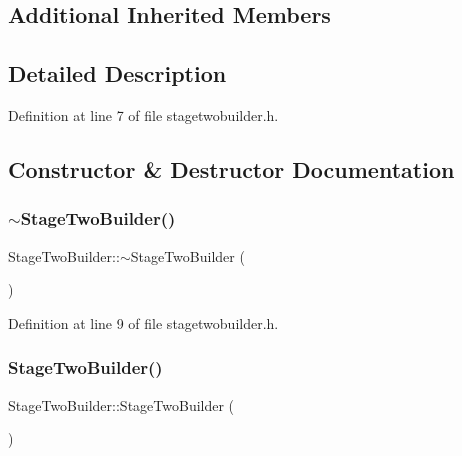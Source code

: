 \subsection*{Additional Inherited Members}


\subsection{Detailed Description}


Definition at line 7 of file stagetwobuilder.\+h.



\subsection{Constructor \& Destructor Documentation}
\mbox{\label{class_stage_two_builder_a46f9a84e6bde6ed8504f3c3f9bad71f3}} 
\subsubsection{\texorpdfstring{$\sim$\+Stage\+Two\+Builder()}{~StageTwoBuilder()}}
{\footnotesize\ttfamily Stage\+Two\+Builder\+::$\sim$\+Stage\+Two\+Builder (\begin{DoxyParamCaption}{ }\end{DoxyParamCaption})\hspace{0.3cm}{\ttfamily [inline]}}



Definition at line 9 of file stagetwobuilder.\+h.

\mbox{\label{class_stage_two_builder_a1cf9558f9d7487a87ffae237c8546f8e}} 
\subsubsection{\texorpdfstring{Stage\+Two\+Builder()}{StageTwoBuilder()}}
{\footnotesize\ttfamily Stage\+Two\+Builder\+::\+Stage\+Two\+Builder (\begin{DoxyParamCaption}{ }\end{DoxyParamCaption})\hspace{0.3cm}{\ttfamily [inline]}}



